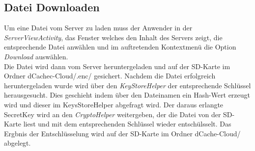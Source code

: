 \documentclass[10pt, a4paper,headsepline]{scrreprt}
\begin{document}
\subsection{Datei Downloaden}
Um eine Datei vom Server zu laden muss der Anwender in der \textit{ServerViewActivity}, das Fenster welches den Inhalt des Servers zeigt, die entsprechende Datei anwählen und im auftretenden Kontextmenü die Option \textit{Download} auswählen.  \\
Die Datei wird dann vom Server heruntergeladen und auf der SD-Karte im Ordner dCachec-Cloud/.enc/ gesichert. Nachdem die Datei erfolgreich heruntergeladen wurde wird über den \textit{KeyStoreHelper} der entsprechende Schlüssel herausgesucht. Dies geschieht indem über den Dateinamen ein Hash-Wert erzeugt wird und dieser im KeysStoreHelper abgefragt wird. Der daraus erlangte SecretKey wird an den \textit{CryptoHelper} weitergeben, der die Datei von der SD-Karte liest und mit dem entsprechenden Schlüssel wieder entschülsselt. Das Ergbnis der Entschlüsselung wird auf der SD-Karte im Ordner dCache-Cloud/ abgelegt.
\end{document}
